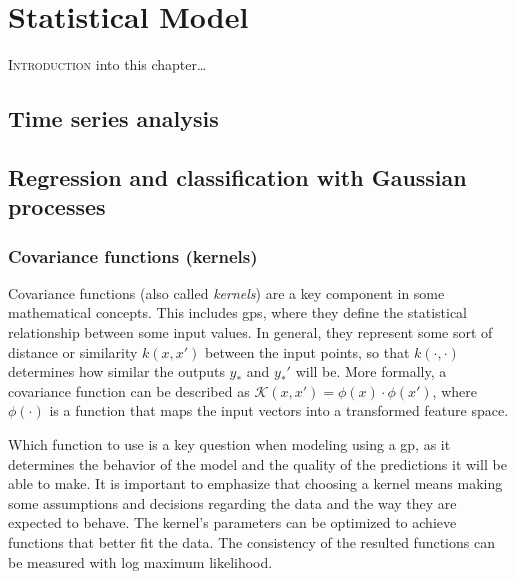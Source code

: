 \chapter{Statistical Model}
\label{chap:statistical_model}

\lettrine{I}{ntroduction} into this chapter\dots

\pagebreak

\section{Time series analysis}
\label{sec:time_series_analysis}

\section{Regression and classification with Gaussian processes}
\label{sec:gaussian_processes}


\subsection{Covariance functions (kernels)}
\label{subsec:covariance_functions}

Covariance functions (also called \textit{kernels}) are a key component in some mathematical concepts.
This includes \acp{gp}, where they define the statistical relationship between some input values.
In general, they represent some sort of distance or similarity $k(x, x')$ between the input points, so that $k(\cdot, \cdot)$ determines how similar the outputs $y_*$ and $y_*'$ will be. 
More formally, a covariance function can be described as $\mathcal{K}(x, x') = \phi(x) \cdot \phi(x')$, where $\phi(\cdot)$ is a function that maps the input vectors into a transformed feature space.

Which function to use is a key question when modeling using a \ac{gp}, as it determines the behavior of the model and the quality of the predictions it will be able to make.
It is important to emphasize that choosing a kernel means making some assumptions and decisions regarding the data and the way they are expected to behave.
The kernel's parameters can be optimized to achieve functions that better fit the data.
The consistency of the resulted functions can be measured with log maximum likelihood.

